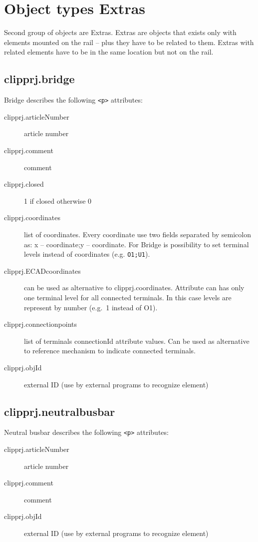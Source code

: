 \documentclass[%
	a4paper,
	oneside,
	listof=numbered,
	parskip=half,
	headsepline=true,
	footsepline=false,
	normalheadings,
	0.7headlines,
	headexclude,
	]{scrbook}
\begin{document}
\section{Object types \glqq{}Extras\grqq{}} 
 
Second group of objects are Extras.
Extras are objects that exists only with elements mounted on the rail – plus they have to be related to them.
Extras with related elements have to be in the same location but not on the rail.

\subsection{clipprj.bridge}
 
Bridge describes the following \verb|<p>| attributes: 

\begin{description}
	\item[clipprj.articleNumber] article number 
	\item[clipprj.comment] comment 
	\item[clipprj.closed] 1 if closed otherwise 0 
	\item[clipprj.coordinates] list of coordinates.
	Every coordinate use two fields separated by semicolon as: x – coordinate;y – coordinate.
	For Bridge is possibility to set terminal levels instead of coordinates (e.g. \verb|O1;U1|).
	\item[clipprj.ECADcoordinates] can be used as alternative to clipprj.coordinates.
	Attribute can has only one terminal level for all connected terminals.
	In this case levels are represent by number (e.g.\ 1 instead of O1).
	\item[clipprj.connectionpoints] list of terminals connectionId attribute values.
	Can be used as alternative to reference mechanism to indicate connected terminals.
	\item[clipprj.objId] external ID (use by external programs to recognize element) 
\end{description}

\subsection{clipprj.neutralbusbar}
 
Neutral busbar describes the following \verb|<p>| attributes: 

\begin{description}
	\item[clipprj.articleNumber] article number 
	\item[clipprj.comment] comment 
	\item[clipprj.objId] external ID (use by external programs to recognize element) 
\end{description}
\end{document}
